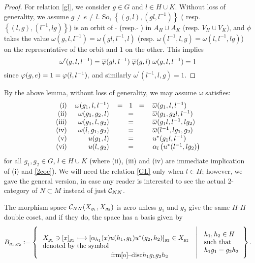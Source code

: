 \begin{proof}
For relation \ref{gl}, we consider $g \in G$
and $l \in H \cup K$. Without loss of generality,
we assume $g \neq e \neq l$. So,
$\left\{ (g,l) , (gl,l^{-1}) \right\}$ (
resp. $\left\{ (l,g) , (l^{-1},lg)
\right\}$) is an orbit of $\; \hat{}$ (resp.
$\check{} \;$) in $A_H \cup A_K$ (resp.
$V_H \cup V_K$), and $\phi$ takes the value
$\omega (g , l , l^{-1}) = \omega (gl ,
l^{-1} , l)$ (resp.
$\omega (l^{-1} , l , g) = \omega (l ,
l^{-1} , lg)$) on the representative of the
orbit and $1$ on the other. This implies
\[
\omega^\prime (g, l, l^{-1}) = \overline{\varphi} (
gl,l^{-1}) \; \overline{\varphi} (g,l) \; \omega (g,
l, l^{-1}) = 1
\]
since $\varphi(g,e) = 1 = \varphi(l,l^{-1})$, and
similarly
$\omega^\prime (l^{-1} , l , g) = 1$.
\end{proof}
By the above lemma, without loss of generality, we may assume $ \omega $ satisfies:
\begin{align}\label{GL}
	\begin{tabular}{rrcl}
\text{(i)} & $\omega (g_1 ,  l , l^{-1}) $ & = \; 1 \; = &
$ \ol{\omega} (g_1 , l , l^{-1})$\\
\text{(ii)} & $\omega (g_1 , g_2 , l)$ & = &
$\ol{\omega} (g_1 , g_2 l , l^{-1})$\\
\text{(iii)} & $\omega (g_1, l, g_2)$ & = &
$\ol{\omega} (g_1 l,l^{-1}, l g_2)$\\
\text{(iv)} & $\omega (l, g_1,g_2)$ & = &
$\ol{\omega} (l^{-1}, l g_1,g_2)$\\
\text{(v)} & $u(g_1, l)$ & = &
$u^*(g_1 l , l^{-1})$\\
\text{(vi)} & $u(l ,g_2)$ & = &
$\alpha_l \left( u^* (l^{-1} , l g_2) \right)$
	\end{tabular}
\end{align}
for all $g_1, g_2 \in G$, $l \in H \cup K$ (where (ii), (iii) and (iv) are immediate implication of (i) and \ref{2coc}).
We will need the relation \ref{GL} only when $ l \in H $; however, we gave the general version, in case any reader is interested to see the actual $ 2 $-category of $ N\subset M $ instead of just $ \mathcal C_{NN} $.
\begin{prop}\label{smbox}
The morphism space $ \mathcal C_{NN} (X_{g_1} , X_{g_2}) $ is zero unless $ g_1 $ and $ g_2 $ give the same $ H $-$ H $ double coset, and if they do, the space has a basis given by
\[
B_{g_1,g_2} := \left\{ \left.
\begin{tabular}{l}
\\
$ X_{g_1} \ni [x]_{g_1} \os {  } \longmapsto [ \alpha_{h_1} (x) u(h_1 , g_1) u^* (g_2 , h_2)]_{g_2} \in X_{g_2} $\\
denoted by the symbol \raisebox{-1.4 em}{\1disc{$h_1 $}{$ g_1 $}{$ g_2 $}{$ h_2 $}}
\end{tabular}
\; \right| \; 
\begin{tabular}{l}
$ h_1, h_2 \in H $\\
such that \\
$ h_1 g_1 = g_2 h_2 $
\end{tabular} \right\}.
\]
\end{prop}
